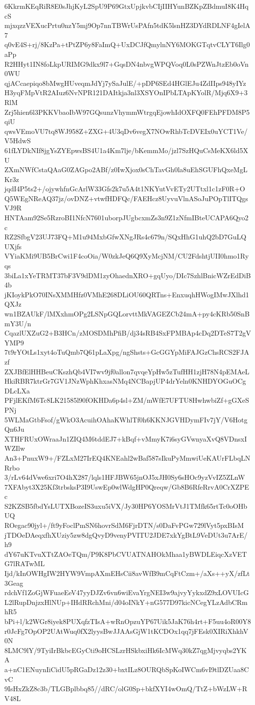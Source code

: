 6KkrmKEqRiR8E0sJhjKyL2SpU9P69GtxUpjkvbCIjIIHYunBZKpZBdmuI8K4HqcS
mjxqzzVEXucPrtu0nzY5mj9Op7nnTBWrUsPAfn5tdK5lsnHZ3DYdRDLNF4gIelA7
q0vE4S+rj/8KzPa+tPtZP6y8FaImQ+UxDCJfQmylnNY6MOKGTqtvCLYT6Ilg0aPp
R2HHyt1IN8foLkpURIMG9dkx9l7+GqsDN4nbvgWPQVoq0L0sPZWnJtzEb0oVn0WU
qjACcaepiqo8bMwgHUveqmJdYj7ySaJulE/+pDP6SEd4HGlEJu4ZdIIps948yIYz
H3yqFMpVtR2AIuz6NvNPR121DAItkja3nl3XSYOnIPbLTApKYolR/Mjq6X9+3RlM
Zrj5hien6l3PKKVbaoIbW97GQsunzVhymmWtrgqEjowhIdOXFQ0FEhPFDM8P5qiU
qwsVEmoVU7tq8WJ958Z+ZXG+4U3qDv6vegX7NOwRhbTcDVEIx0uYCT1Ve/V5HdwS
61fLYDkNIf8jgYsZYEpwsBS4U1a4Km7lje/bKemmMo/jzl7SzHQuCsMeKX6ld5XU
ZXmNWfCstaQAaG0ZAGpo2ABf/z0IwXjox0sChTavGh0la8uEhSGUFhQxeMgLKr3z
jqdI4P5ts2+/ojywhfnGcArlW33Gfs2k7u5A4t1NKYutVvETy2UTtxl1c1zF0R+O
Q5WEgNReAQ37jz/ovDNZ+vtwfHDFQc/FAEHcz8UyvuVlnASoJuPOpTlITQgsVJ9R
HNTAam92Se5RzroBI1NfcN7601uborpJUgbcxmZs3n9Z1zNfmIBteUCAPA6Qyo2c
RZ2SfbgV23UJ73FQ+M1u94MxbGfwXNgJRs4c679n/SQxHhG1uhQ2bD7GuLQUXjfs
VYiaKMi9UB5BrCwi1F4coOia/W0zkJeQ6Q9XyMcjNM/CU2FdshtjUII0hmo1Ryqs
3biLa1xYeTRMT37bF3V9dDM1zyOhaednXRO+gqUyo/DIc7SzhlBnicWZrEdDiB4b
jKIoykPkO70INsXMMHfz0VMhE268DLiOU60QRTns+EnxuqhHWogIMwJXlhd1QXJz
wn1BZAUkF/lMXxhmOPg2LSNpGQLorvttMkVAGEZCb24mA+py4cKRb50SnBmY3U/n
CqazlUXZuG2+B3HCn/zMOSDMhPfiB/dj34sRB4SxFPMBAp4cDq2DTeS7T2gVYMP9
7t9rYOtLs1xyt4oTuQmb7Q61pLaXpg/ngShsts+GcGGYpMiFAJGzChsRCS2FJAzf
ZXJBfElHHBeuCKszhQb4VI7wv9jf0allon7qvqeYpHw5zTufHH1zjH78N4pEMAeL
HkiRBR7ktrGr7GV1JNzWphKhxasNMq4NCBapjUP4drYeln0KNHDYOGuOCgDLcLXa
PFjlEKfM6Tc8LK21585l90fOKHDa6p4sl+ZM/mWfE7UFTU8HwhwbiZf+gGXeSPNj
5WLMaGtbFsof/gWkO3AcuihOAhaKWhlTf0h6KKNJGVHDymFIv7jY/V6HotgQn6Ju
XTHFRUxOWraaJn1ZIQ4M6tddEJ7+kBqf+vMmyK7i6syGVwnyaXvQ8VDnsxIWZIlw
An3+PnuxW9+/FZLxM27IrEQ4KNEahl2wBaf587sIkuPyMmwiUeKAUrFLbqLNRrbo
3/rLv64dVwe6xri7O4hX287/lqls1HFJBW65jnOJ5xJH0Sy6sHOc9yzVvIZ5ZLnW
7XFAbyt3X25Kf3trbsksP3I9UswEp0wlWdgHP0Qreqw/Gb8B6RfeRrvA0CrXZPEc
S2KZSB5fbdYsLUTXBozeIS3uxu5iVX/Jy30HP6YOSMrVtJ1TMfk65rtTc0oOHbUQ
ROegac90jyl+/ft9yFoclPmSN6hovrSdM6FjrDTN/s0DaFvPGw729lVyt5pxBIsM
jTDOeDAeqxfhXUziy5zw8dgQvyD9venyPVITU2JDE7xkYgBtL9VeDUt3u7ArE/h9
dY67uKTvuXTtZAOeTQm/P9K8PbCVUATNAHOkMhaa1yBWDLEiqcXzVETG7lRATwML
Ijd/kInOWHgIW2HYW9VmpAXmEHsCii8avWfB9mCqFtCzm+/aXs++yX/zfLt3Geag
rdchVf1ZoGjWFuaeEeV47yyDJZv6vn6wiEvaYrgNEI3w9ajvyYykxdZ9xLOVUIcG
L2lRupDnjzxHlNUp+IHdRRchMni/d04oINkY+nG577D97kicNCegYLzAdbCRmhR5
bPi+l/k2WGr8iyek8PUXqfzTIsA+wRnOpzuYP67Uik5JaK76h4rt+F5uu4oR00Y8
r0JcFg7OpOP2UAtWuq0fX2lyysBwJJAAsGjW1tKCDOx1qq7jFEsk0XIRiXhkhV0N
8LMC9lY/9TyiIrBkbcEGyCti9oHCSLzrHSkbxiHk6IcMWq30kZ7qgMjvyqbs2YKA
a+nC1ENuynIiCidU5pRGaDz12z30+bxtILz8OURQbSpKoIWCm6vI9tlDZUaa8CvC
9IsHxZkZ8c3b/TLGBplbbq85//dRC/olG0Sp+bkfXYI4wOmQ/TtZ+bWzLW+RV48L

